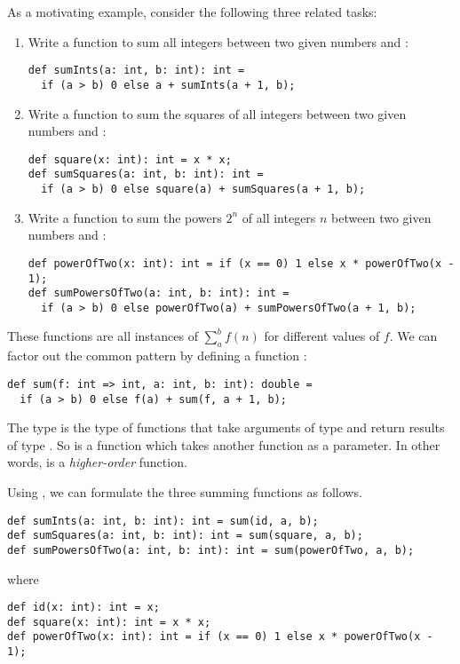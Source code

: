 As a motivating example, consider the following three related tasks:
\begin{enumerate}
\item
Write a function to sum all integers between two given numbers  and :
\begin{lstlisting}
def sumInts(a: int, b: int): int =
  if (a > b) 0 else a + sumInts(a + 1, b);
\end{lstlisting}
\item 
Write a function to sum the squares of all integers between two given numbers 
 and :
\begin{lstlisting}
def square(x: int): int = x * x;
def sumSquares(a: int, b: int): int =
  if (a > b) 0 else square(a) + sumSquares(a + 1, b);
\end{lstlisting}
\item
Write a function to sum the powers $2^n$ of all integers $n$ between
two given numbers  and :
\begin{lstlisting}
def powerOfTwo(x: int): int = if (x == 0) 1 else x * powerOfTwo(x - 1);
def sumPowersOfTwo(a: int, b: int): int =
  if (a > b) 0 else powerOfTwo(a) + sumPowersOfTwo(a + 1, b);
\end{lstlisting}
\end{enumerate}
These functions are all instances of
\(\sum^b_a f(n)\) for different values of $f$. 
We can factor out the common pattern by defining a function :
\begin{lstlisting}
def sum(f: int => int, a: int, b: int): double =
  if (a > b) 0 else f(a) + sum(f, a + 1, b);
\end{lstlisting}
The type  is the type of functions that
take arguments of type  and return results of type
. So  is a function which takes another function as 
a parameter. In other words,  is a {\em higher-order}
function.

Using , we can formulate the three summing functions as
follows.
\begin{lstlisting}
def sumInts(a: int, b: int): int = sum(id, a, b);
def sumSquares(a: int, b: int): int = sum(square, a, b);
def sumPowersOfTwo(a: int, b: int): int = sum(powerOfTwo, a, b);
\end{lstlisting}
where
\begin{lstlisting}
def id(x: int): int = x;
def square(x: int): int = x * x;
def powerOfTwo(x: int): int = if (x == 0) 1 else x * powerOfTwo(x - 1);
\end{lstlisting}


